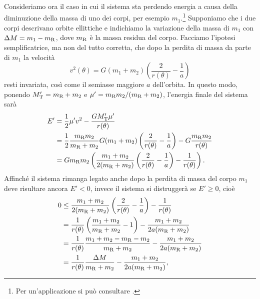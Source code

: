 {Consideriamo ora il caso in cui il sistema sta perdendo energia a causa della
diminuzione della massa di uno dei corpi, per esempio
$m_1$.\footnote{Per un'applicazione si può
  consultare \textcite{padmanabhan:stars}.}
Supponiamo che i due corpi descrivano orbite ellittiche e indichiamo la
variazione della massa di $m_1$ con $\Delta M = m_1 - m_\textup{R}$, dove
$m_\textup{R}$ è la massa residua del corpo. Facciamo l'ipotesi semplificatrice,
ma non del tutto corretta, che dopo la perdita di massa da parte di $m_1$ la
velocità
\begin{equation}
  v^2(\theta) = G(m_1 + m_2)
  \left(
    \frac{2}{r(\theta)} - \frac{1}{a}
  \right)
\end{equation}
resti invariata, così come il semiasse maggiore $a$ dell'orbita. In questo modo,
ponendo $M'_\textup{T}=m_\textup{R}+m_2$ e $\mu' = m_\textup{R}m_2/(m_\textup{R}
+ m_2)$, l'energia finale del sistema sarà
\begin{equation}
  \begin{split}
    E' &= \frac{1}{2}\mu'v^2 - \frac{GM'_\textup{T}\mu'}{r(\theta)} \\
    &= \frac{1}{2}\frac{m_\textup{R}m_2}{m_\textup{R} + m_2}G(m_1 + m_2)
    \left(
      \frac{2}{r(\theta)} - \frac{1}{a}
    \right) - G\frac{m_\textup{R}m_2}{r(\theta)} \\
    &= Gm_\textup{R}m_2
    \left(
      \frac{m_1 + m_2}{2(m_\textup{R} + m_2)}
      \left(
        \frac{2}{r(\theta)} - \frac{1}{a}
      \right) - \frac{1}{r(\theta)}
    \right).
  \end{split}
\end{equation}
Affinché il sistema rimanga legato anche dopo la perdita di massa del corpo
$m_1$ deve risultare ancora $E' < 0$, invece il sistema si distruggerà se $E'
\geq 0$, cioè
\begin{equation}
  \begin{split}
    0 &\leq \frac{m_1 + m_2}{2(m_\textup{R} + m_2)}
    \left(
      \frac{2}{r(\theta)} - \frac{1}{a}
    \right) - \frac{1}{r(\theta)} \\
    &= \frac{1}{r(\theta)}
    \left(
      \frac{m_1 + m_2}{m_\textup{R} + m_2} - 1
    \right) - \frac{m_1 + m_2}{2a(m_\textup{R} + m_2)} \\
    &= \frac{1}{r(\theta)}\frac{m_1 + m_2 - m_\textup{R} - m_2}{m_\textup{R} +
      m_2} - \frac{m_1 + m_2}{2a(m_\textup{R} + m_2)} \\
    &= \frac{1}{r(\theta)}\frac{\Delta M}{m_\textup{R} +
      m_2} - \frac{m_1 + m_2}{2a(m_\textup{R} + m_2)},

\end{split}
\end{equation}}

